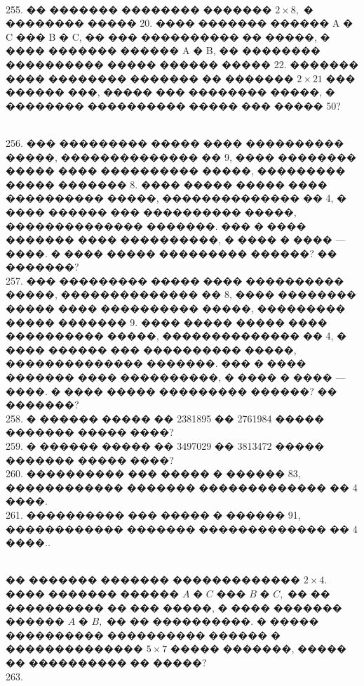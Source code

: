 \documentclass[12pt]{article}
\begin{document}
\begin{figure}[ht!]
\end{figure}\\
255. �� ������� �������� ������� $2\times 8,$ � �������� ����� 20. ���� ������� ������ A � C ��� B � C, �� ��� ���������� �� �����, � ���� ������� ������ A � B, �� �������� ���������� ����� ������ ����� 22. ������� ���� �������� ������� �� ������� $2\times 21$ ��� ������ ���, ����� ��� �������� �����, � �������� ���������� ����� ��� ����� 50?
\begin{figure}[ht!]
\end{figure}\\
256. ��� ��������� ����� ���� ���������� �����, �������������� �� 9, ���� �������� ����� ���� ���������� �����, ��������� ����� ������� 8. ���� ����� ����� ���� ���������� �����, �������������� �� 4, � ���� ������ ��� ���������� �����, �������������� �������. ��� � ���� ������� ���� ����������, � ���� � ���� --- ����. � ���� ����� ��������� ������? �� �������?\\
257. ��� ��������� ����� ���� ���������� �����, �������������� �� 8, ���� �������� ����� ���� ���������� �����, ��������� ����� ������� 9. ���� ����� ����� ���� ���������� �����, �������������� �� 4, � ���� ������ ��� ���������� �����, �������������� �������. ��� � ���� ������� ���� ����������, � ���� � ���� --- ����. � ���� ����� ��������� ������? �� �������?\\
258. � ������ ����� �� 2381895 �� 2761984 ����� ������� ����� ����?\\
259. � ������ ����� �� 3497029 �� 3813472 ����� ������� ����� ����?\\
260. ���������� ��� ����� � ������ 83, ������������ ������� ������������� �� 4 ����.\\
261. ���������� ��� ����� � ������ 91, ������������ ������� ������������� �� 4 ����.\newpage{}. \begin{figure}[ht!]
\end{figure}\\
�� ������� ������� ������������� $2\times4.$ ���� ������� ������ $A$ � $C$ ��� $B$ � $C,$ �� �� ���������� �� ��� �����, � ���� ������� ������ $A$ � $B,$ �� �� ����������. � ����� ���������� ���������� ������ � �������������� $5\times7$ ����� �������, ����� �� ���������� �� �����?\\
263. \begin{figure}[ht!]
\end{figure}\\
\end{document}
